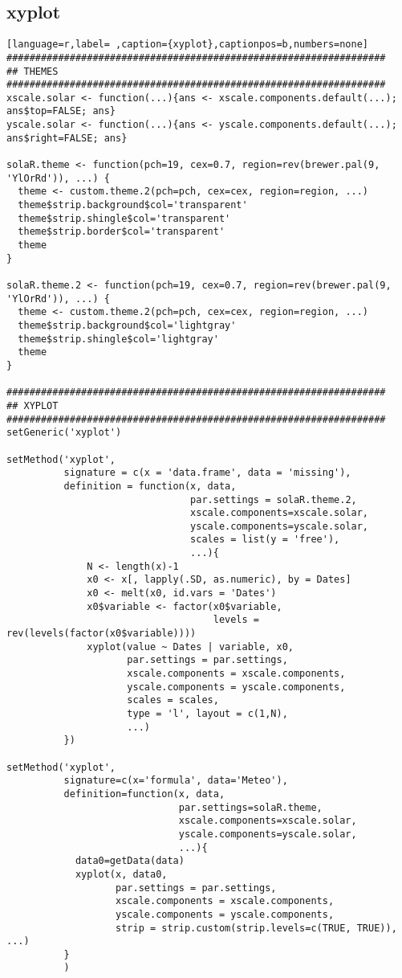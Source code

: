\subsection{xyplot}
\label{sec:org0cd2dfa}
\label{subsec:xyplot}
\begin{lstlisting}[language=r,label= ,caption={xyplot},captionpos=b,numbers=none]
##################################################################
## THEMES
##################################################################
xscale.solar <- function(...){ans <- xscale.components.default(...); ans$top=FALSE; ans}
yscale.solar <- function(...){ans <- yscale.components.default(...); ans$right=FALSE; ans}

solaR.theme <- function(pch=19, cex=0.7, region=rev(brewer.pal(9, 'YlOrRd')), ...) {
  theme <- custom.theme.2(pch=pch, cex=cex, region=region, ...)
  theme$strip.background$col='transparent'
  theme$strip.shingle$col='transparent'
  theme$strip.border$col='transparent'
  theme
}

solaR.theme.2 <- function(pch=19, cex=0.7, region=rev(brewer.pal(9, 'YlOrRd')), ...) {
  theme <- custom.theme.2(pch=pch, cex=cex, region=region, ...)
  theme$strip.background$col='lightgray'
  theme$strip.shingle$col='lightgray'
  theme
}

##################################################################
## XYPLOT
##################################################################
setGeneric('xyplot')

setMethod('xyplot',
          signature = c(x = 'data.frame', data = 'missing'),
          definition = function(x, data,
                                par.settings = solaR.theme.2,
                                xscale.components=xscale.solar,
                                yscale.components=yscale.solar,
                                scales = list(y = 'free'),
                                ...){
              N <- length(x)-1
              x0 <- x[, lapply(.SD, as.numeric), by = Dates]
              x0 <- melt(x0, id.vars = 'Dates')
              x0$variable <- factor(x0$variable,
                                    levels = rev(levels(factor(x0$variable))))
              xyplot(value ~ Dates | variable, x0,
                     par.settings = par.settings,
                     xscale.components = xscale.components,
                     yscale.components = yscale.components,
                     scales = scales,
                     type = 'l', layout = c(1,N),
                     ...)
          })

setMethod('xyplot',
          signature=c(x='formula', data='Meteo'),
          definition=function(x, data,
                              par.settings=solaR.theme,
                              xscale.components=xscale.solar,
                              yscale.components=yscale.solar,
                              ...){
            data0=getData(data)
            xyplot(x, data0,
                   par.settings = par.settings,
                   xscale.components = xscale.components,
                   yscale.components = yscale.components,
                   strip = strip.custom(strip.levels=c(TRUE, TRUE)), ...)
          }
          )


\end{lstlisting}
